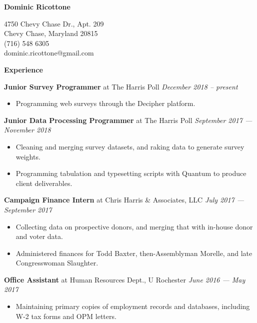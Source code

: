\documentclass[12pt]{article}
\newenvironment{details}{
\begin{itemize}[label={}]
	\small \setlength{\itemsep}{0pt}
}{\end{itemize}}
\begin{document}
\centering \Huge
\textbf{Dominic Ricottone}

\footnotesize
\begin{multicols}{2}
4750 Chevy Chase Dr., Apt. 209 \\
Chevy Chase, Maryland 20815 \\
(716) 548 6305 \\
dominic.ricottone@gmail.com
\end{multicols}

\large
\textbf{Experience} \hrulefill

\normalsize
\textbf{Junior Survey Programmer} at The Harris Poll \hfill \textit{December 2018 -- present}
\begin{details}
 	\item Programming web surveys through the Decipher platform.
\end{details}

\normalsize
\textbf{Junior Data Processing Programmer} at The Harris Poll \hfill \textit{September 2017 --- November 2018}
\begin{details}
 	\item Cleaning and merging survey datasets, and raking data to generate survey weights.
	\item Programming tabulation and typesetting scripts with Quantum to produce client deliverables.
\end{details}

\normalsize
\textbf{Campaign Finance Intern} at Chris Harris \& Associates, LLC \hfill \textit{July 2017 --- September 2017}
\begin{details}
	\item Collecting data on prospective donors, and merging that with in-house donor and voter data.
	\item Administered finances for Todd Baxter, then-Assemblyman Morelle, and late Congresswoman Slaughter.
\end{details}

\normalsize
\textbf{Office Assistant} at Human Resources Dept., U Rochester  \hfill \textit{June 2016 --- May 2017}
\begin{details}
	\item Maintaining primary copies of employment records and databases, including W-2 tax forms and OPM letters.
\end{details}

\end{document}

